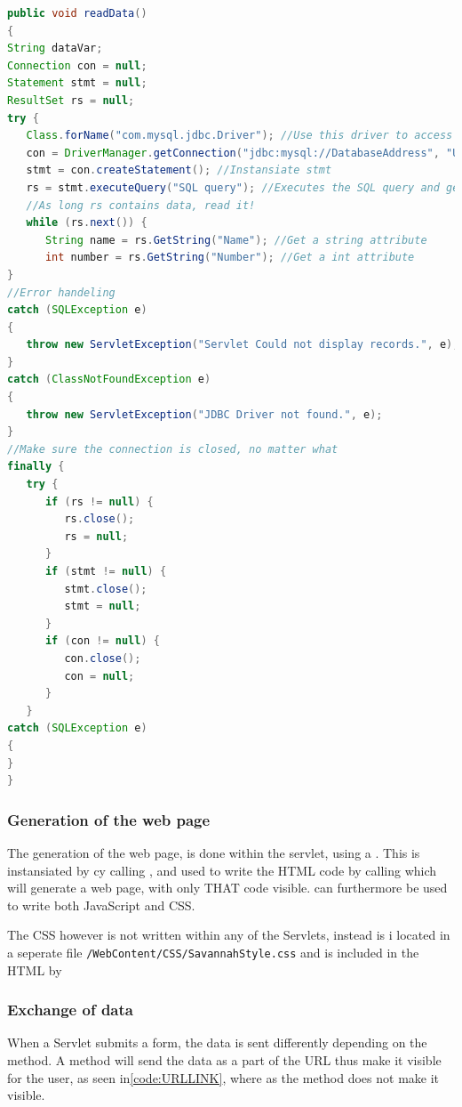 \begin{lstlisting}[language=Java,label=code:readDatabase,caption=Code to read data from the database]
public void readData()
{
String dataVar;
Connection con = null;
Statement stmt = null;
ResultSet rs = null;
try {
   Class.forName("com.mysql.jdbc.Driver"); //Use this driver to access the database
   con = DriverManager.getConnection("jdbc:mysql://DatabaseAddress", "Username", "Password"); //Instansiate the connection
   stmt = con.createStatement(); //Instansiate stmt
   rs = stmt.executeQuery("SQL query"); //Executes the SQL query and get the result store in RS
   //As long rs contains data, read it!
   while (rs.next()) { 
      String name = rs.GetString("Name"); //Get a string attribute
      int number = rs.GetString("Number"); //Get a int attribute
}
//Error handeling
catch (SQLException e) 
{		
   throw new ServletException("Servlet Could not display records.", e);
} 
catch (ClassNotFoundException e) 
{			
   throw new ServletException("JDBC Driver not found.", e);
}
//Make sure the connection is closed, no matter what 
finally {
   try {
      if (rs != null) {
         rs.close();
         rs = null;
      }
      if (stmt != null) {
         stmt.close();
         stmt = null;
      }
      if (con != null) {
         con.close();
         con = null;
      }
   } 
catch (SQLException e) 
{			
}
}

\end{lstlisting}

\subsubsection{Generation of the web page}
The generation of the web page, is done within the servlet, using a . This is instansiated by cy calling , and used to write the HTML code by calling  which will generate a web page, with only THAT code visible.  can furthermore be used to write both JavaScript and CSS.

The CSS however is not written within any of the Servlets, instead is i located in a seperate file \verb+/WebContent/CSS/SavannahStyle.css+ and is included in the HTML by 


\subsubsection{Exchange of data}
When a Servlet submits a form, the data is sent differently depending on the  method. A  method will send the data as a part of the URL thus make it visible for the user, as seen in\autoref{code:URLLINK}, where as the  method does not make it visible.

